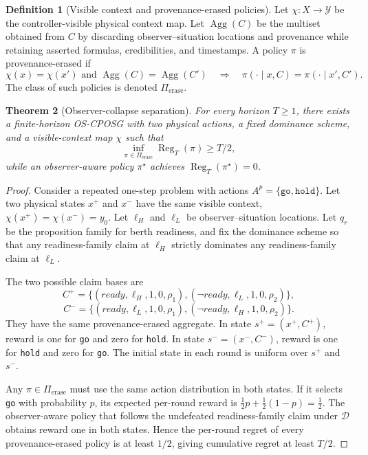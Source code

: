 \documentclass[11pt]{article}
\newcommand{\OSCPOSG}{\mbox{\normalfont\textsc{OS-CPOSG}}}
\newcommand{\Reg}{\operatorname{Reg}}
\newcommand{\Agg}{\operatorname{Agg}}
\newcommand{\1}{\mathbf{1}}
\theoremstyle{definition}
\newtheorem{definition}{Definition}[section]
\theoremstyle{plain}
\newtheorem{theorem}[definition]{Theorem}
\theoremstyle{remark}
\begin{document}
\begin{definition}[Visible context and provenance-erased policies]
\label{def:visible}
Let $\chi:X\to\mathcal Y$ be the controller-visible physical context map. Let $\Agg(C)$ be the multiset obtained from $C$ by discarding observer--situation locations and provenance while retaining asserted formulas, credibilities, and timestamps. A policy $\pi$ is provenance-erased if
\[
\chi(x)=\chi(x')\text{ and }\Agg(C)=\Agg(C')
\quad\Rightarrow\quad
\pi(\cdot\mid x,C)=\pi(\cdot\mid x',C').
\]
The class of such policies is denoted $\Pi_{\mathrm{erase}}$.
\end{definition}

\begin{theorem}[Observer-collapse separation]
\label{thm:separation}
For every horizon $T\ge 1$, there exists a finite-horizon \OSCPOSG{} with two physical actions, a fixed dominance scheme, and a visible-context map $\chi$ such that
\[
\inf_{\pi\in\Pi_{\mathrm{erase}}}\Reg_T(\pi)\ge T/2,
\]
while an observer-aware policy $\pi^{\star}$ achieves $\Reg_T(\pi^{\star})=0$.
\end{theorem}

\begin{proof}
Consider a repeated one-step problem with actions $A^p=\{\texttt{go},\texttt{hold}\}$. Let two physical states $x^+$ and $x^-$ have the same visible context, $\chi(x^+)=\chi(x^-)=y_0$. Let $\ell_H$ and $\ell_L$ be observer--situation locations. Let $q_r$ be the proposition family for berth readiness, and fix the dominance scheme so that any readiness-family claim at $\ell_H$ strictly dominates any readiness-family claim at $\ell_L$.

The two possible claim bases are
\[
C^+=\{(ready,\ell_H,1,0,\rho_1),(\neg ready,\ell_L,1,0,\rho_2)\},
\]
\[
C^-=\{(ready,\ell_L,1,0,\rho_1),(\neg ready,\ell_H,1,0,\rho_2)\}.
\]
They have the same provenance-erased aggregate. In state $s^+=(x^+,C^+)$, reward is one for \texttt{go} and zero for \texttt{hold}. In state $s^-=(x^-,C^-)$, reward is one for \texttt{hold} and zero for \texttt{go}. The initial state in each round is uniform over $s^+$ and $s^-$.

Any $\pi\in\Pi_{\mathrm{erase}}$ must use the same action distribution in both states. If it selects \texttt{go} with probability $p$, its expected per-round reward is $\frac12p+\frac12(1-p)=\frac12$. The observer-aware policy that follows the undefeated readiness-family claim under $\mathcal D$ obtains reward one in both states. Hence the per-round regret of every provenance-erased policy is at least $1/2$, giving cumulative regret at least $T/2$.
\end{proof}
\end{document}

